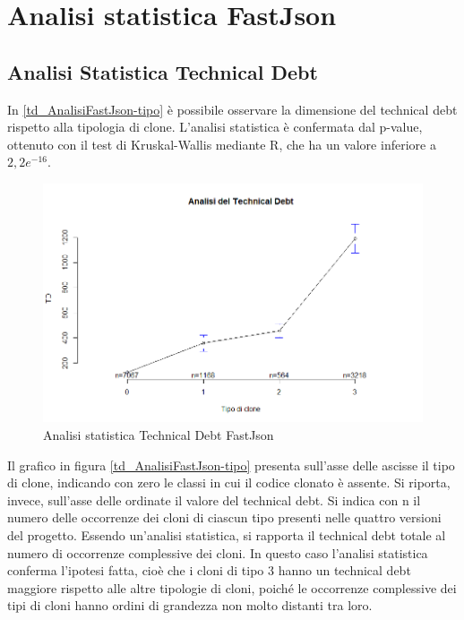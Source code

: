 \newpage
\section{Analisi statistica FastJson}

\subsection{Analisi Statistica Technical Debt}
In \autoref{td_AnalisiFastJson-tipo} è possibile osservare la dimensione del technical debt rispetto alla tipologia di clone. L'analisi statistica è confermata dal p-value, ottenuto con il test di Kruskal-Wallis mediante R, che ha un valore inferiore a $2,2 e^{-16}$.
\begin{figure}[htbp]
	\centering
	\includegraphics[scale=0.5]{analisi_R/AnalisiFastJson/1-gplot-td-type.png}
\caption{Analisi statistica Technical Debt FastJson}
\label{td_AnalisiFastJson-tipo}
\end{figure}
Il grafico in figura \autoref{td_AnalisiFastJson-tipo} presenta sull'asse delle ascisse il tipo di clone, indicando con zero le classi in cui il codice clonato è assente. Si riporta, invece, sull'asse delle ordinate il valore del technical debt. Si indica con n il numero delle occorrenze dei cloni di ciascun tipo presenti nelle quattro versioni del progetto. Essendo un'analisi statistica, si rapporta il technical debt totale al numero di occorrenze complessive dei cloni. In questo caso l'analisi statistica conferma l'ipotesi fatta, cioè che i cloni di tipo 3 hanno un technical debt maggiore rispetto alle altre tipologie di cloni, poiché le occorrenze complessive dei tipi di cloni hanno ordini di grandezza non molto distanti tra loro.

